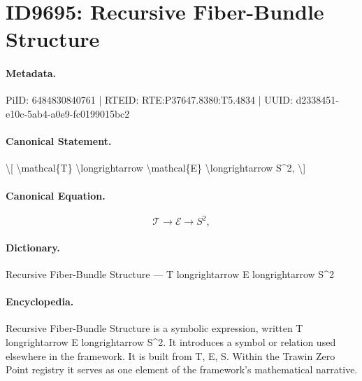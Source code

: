\section*{ID9695: Recursive Fiber-Bundle Structure}
\paragraph{Metadata.}
PiID: 6484830840761 | RTEID: RTE:P37647.8380:T5.4834 | UUID: d2338451-e10c-5ab4-a0e9-fc0199015bc2

\paragraph{Canonical Statement.}
\textbackslash{}[ \textbackslash{}mathcal\{T\} \textbackslash{}longrightarrow \textbackslash{}mathcal\{E\} \textbackslash{}longrightarrow S\textasciicircum{}2, \textbackslash{}]

\paragraph{Canonical Equation.}
\[
\mathcal{T} \longrightarrow \mathcal{E} \longrightarrow S^2,
\]

\paragraph{Dictionary.}
Recursive Fiber-Bundle Structure — T longrightarrow E longrightarrow S\textasciicircum{}2

\paragraph{Encyclopedia.}
Recursive Fiber-Bundle Structure is a symbolic expression, written T longrightarrow E longrightarrow S\textasciicircum{}2. It introduces a symbol or relation used elsewhere in the framework. It is built from T, E, S. Within the Trawin Zero Point registry it serves as one element of the framework's mathematical narrative.
